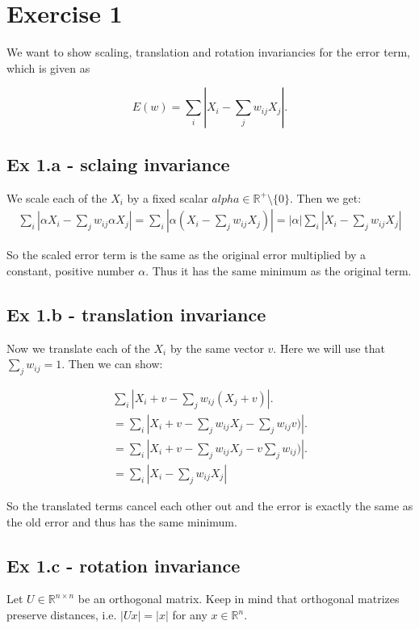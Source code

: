 \section*{Exercise 1}

We want to show scaling, translation and rotation invariancies for the error term, which is given as

\begin{equation}
	E(w)  = \sum_i | X_i - \sum_j w_{ij} X_j|.
\end{equation}

\subsection*{Ex 1.a - sclaing invariance}

We scale each of the $X_i$ by a fixed scalar $alpha \in \mathbb{R}^+\setminus\{0\}$.
Then we get:
\begin{align*}
	\sum_i | \alpha X_i - \sum_j w_{ij} \alpha X_j| = \sum_i | \alpha (X_i - \sum_j w_{ij}  X_j)|  = |\alpha| \sum_i | X_i - \sum_j w_{ij} X_j|
\end{align*}

So the scaled error term is the same as the original error multiplied by a constant, positive number $\alpha$. Thus it has the same minimum as the original term.

\subsection*{Ex 1.b - translation invariance}

Now we translate each of the $X_i$ by the same vector $v$.
Here we will use that $\sum_j w_{ij} = 1$. Then we can show:

\begin{align*}
	\sum_i | X_i +v- \sum_j w_{ij} (X_j+v)|. \\
	= \sum_i | X_i +v- \sum_j w_{ij}X_j -\sum_j w_{ij} v)|. \\
	= \sum_i | X_i +v- \sum_j w_{ij}X_j -v\sum_j w_{ij})|. \\
	= \sum_i | X_i - \sum_j w_{ij} X_j|
\end{align*}

So the translated terms cancel each other out and the error is exactly the same as the old error and thus has the same minimum.

\subsection*{Ex 1.c - rotation invariance}
Let $U \in \mathbb{R}^{n \times n}$ be an orthogonal matrix. Keep in mind that orthogonal matrizes preserve distances, i.e. $|Ux| = |x|$ for any $x \in \mathbb{R}^n$.

